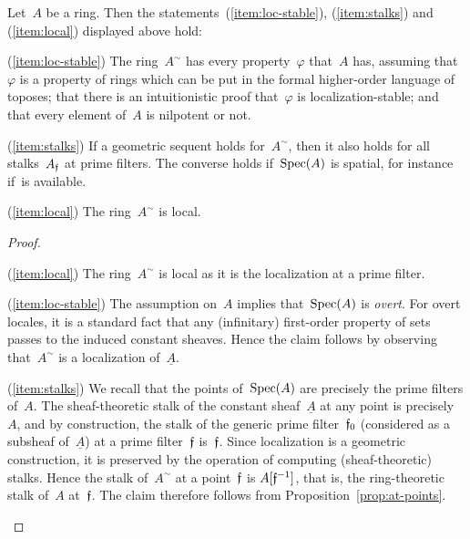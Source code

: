 \documentclass{ws-rv9x6}
\begin{document}
{\begin{proposition}\label{prop:immediate-consequences}
Let~$A$ be a ring. Then the statements~(\ref{item:loc-stable}), (\ref{item:stalks}) and
(\ref{item:local}) displayed above hold:
\begin{Alphlist}[(D)]
\item[(\ref{item:loc-stable})]
The ring~$A^\sim$ has every property~$\varphi$ that~$A$ has, assuming
that~$\varphi$ is a property of rings which can be put in the formal
higher-order language of toposes; that there is an intuitionistic proof
that~$\varphi$ is localization-stable; and that every element of~$A$ is
nilpotent or not.
\item[(\ref{item:stalks})]
If a geometric sequent holds for~$A^\sim$, then it also holds for all
stalks~$A_{\mathfrak{f}}$ at prime filters. The converse holds if~$\mathrm{Spec}(A)$ is spatial,
for instance if~\BPIT is available.
\item[(\ref{item:local})] The ring~$A^\sim$ is local.
\end{Alphlist}
\end{proposition}

\begin{proof}
\begin{Alphlist}[(D)]
\item[(\ref{item:local})] The ring~$A^\sim$ is local as it is the
localization at a prime filter.
\item[(\ref{item:loc-stable})] The assumption on~$A$ implies that~$\mathrm{Spec}(A)$ is
\emph{overt}. For overt locales, it is a standard fact that any (infinitary)
first-order property of sets passes to the induced constant sheaves. Hence the
claim follows by observing that~$A^\sim$ is a localization of~$\underline{A}$.
\item[(\ref{item:stalks})] We recall that the points of~$\mathrm{Spec}(A)$ are
precisely the prime filters of~$A$. The sheaf-theoretic stalk of the constant
sheaf~$\underline{A}$ at any point is precisely~$A$, and by construction, the
stalk of the generic prime filter~$\mathfrak{f}_0$ (considered as a subsheaf
of~$\underline{A}$) at a prime filter~$\mathfrak{f}$ is~$\mathfrak{f}$. Since localization is a
geometric construction, it is preserved by the operation of computing
(sheaf-theoretic) stalks. Hence the stalk of~$A^\sim$ at a point~$\mathfrak{f}$ is
$A[\mathfrak{f}^{-1}]$, that is, the ring-theoretic stalk of~$A$ at~$\mathfrak{f}$. The claim
therefore follows from Proposition~\ref{prop:at-points}.\qedhere
\end{Alphlist}
\end{proof}

}
\end{document}
